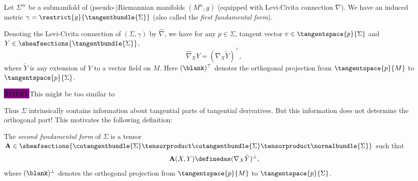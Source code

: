 \documentclass[titlepage,numbers=noenddot,headinclude,oneside,%
footinclude=true,cleardoublepage=empty,%
BCOR=5mm,paper=a4,fontsize=11pt,%
english,%
]{scrartcl}
\newcommand{\todomark}{%
    \colorbox{purple}{%
        \textnormal\ttfamily\bfseries\color{white}%
        TODO%
    }%
}
\newcommand{\todo}[1][]{%
    \ifstrempty{#1}{%
        \def\todotext{Todo}%
    }{%
        \def\todotext{Todo: #1}%
    }%
    \todomark%
    {%
        \marginpar{%
            \raggedright\normalfont\sffamily\scriptsize\todotext%
        }%
    }%
}
\begin{document}
{ \newcommand{\Mconnection}{\nabla}\newcommand{\Sigmaconnection}{\hat{\nabla}}
Let \( \Sigma^m \) be a submanifold of (pseudo-)Riemannian manifolds \( (M^n,g) \) (equipped with Levi-Civita connection \( \Mconnection \)). We have an induced metric \( \gamma=\restrict{g}{\tangentbundle{\Sigma}} \) (also called the \emph{first fundamental form}).
\begin{fact}
  Denoting the Levi-Civita connection of \( (\Sigma,\gamma) \) by \( \Sigmaconnection \), we have for any \( p\in \Sigma \), tangent vector \( v\in \tangentspace{p}{\Sigma} \) and \( Y\in \sheafsections{\tangentbundle{\Sigma}} \),
  \begin{equation*}
    \Sigmaconnection_X Y=(\Mconnection_X \tilde{Y})^\top,
  \end{equation*}
  where \( \tilde{Y} \) is any extension of \( Y \) to a vector field on \( M \). Here \( (\blank)^\top \) denotes the orthogonal projection from \( \tangentspace{p}{M} \) to \( \tangentspace{p}{\Sigma} \).

  \todo{This might be too similar to \cite[2.1]{leeGeometricRelativity2019}}
\end{fact}
Thus \( \Sigma \) intrinsically contains information about tangential parts of tangential derivatives. But this information does not determine the orthogonal part! This motivates the following definition:
\begin{definition}
    The \emph{second fundamental form} of \( \Sigma \) is a tensor \( \mathbf{A}\in \sheafsections{\cotangentbundle{\Sigma}\tensorproduct \cotangentbundle{\Sigma}\tensorproduct \normalbundle{\Sigma}} \) such that
    \begin{equation*}
        \mathbf{A}(X,Y)\definedas (\Mconnection_X \tilde{Y})^\perp,
    \end{equation*}
    where \( (\blank)^\perp \) denotes the orthogonal projection from \( \tangentspace{p}{M} \) to \( \tangentspace{p}{\Sigma} \).
\end{definition}  

}
\end{document}
